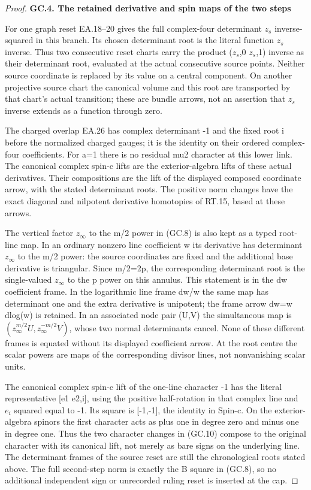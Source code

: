 \begin{proof}
\par

\medskip\noindent\textbf{GC.4. The retained derivative and spin maps of the two steps}

\par\nobreak

For one graph reset EA.18--20 gives the full complex-four
determinant \(z_{s}\) inverse-squared in this branch. Its chosen
determinant root is the literal function \(z_{s}\) inverse. Thus two
consecutive reset charts carry the product
(\(z_{s}\),0 \(z_{s}\),1) inverse as their determinant root, evaluated at
the actual consecutive source points. Neither source coordinate
is replaced by its value on a central component. On another
projective source chart the canonical volume and this root are
transported by that chart's actual transition; these are bundle
arrows, not an assertion that \(z_{s}\) inverse extends as a function
through zero.

The charged overlap EA.26 has complex determinant -1 and the
fixed root i before the normalized charged gauges; it is the
identity on their ordered complex-four coefficients. For a=1
there is no residual mu2 character at this lower link. The
canonical complex spin-c lifts are the exterior-algebra lifts
of these actual derivatives. Their compositions are the lift
of the displayed composed coordinate arrow, with the stated
determinant roots. The positive norm changes have the exact
diagonal and nilpotent derivative homotopies of RT.15, based
at these arrows.

The vertical factor \(z_{\infty}\) to the m/2 power in (GC.8) is also
kept as a typed root-line map. In an ordinary nonzero line
coefficient w its derivative has determinant \(z_{\infty}\) to the
m/2 power: the source coordinates are fixed and the additional
base derivative is triangular. Since m/2=2p, the corresponding
determinant root is the single-valued \(z_{\infty}\) to the p power
on this annulus. This statement is in the dw coefficient frame.
In the logarithmic line frame dw/w the same map has determinant
one and the extra derivative is unipotent; the frame arrow
dw=w dlog(w) is retained. In an associated node pair (U,V)
the simultaneous map is \((z_\infty^{m/2}U,z_\infty^{-m/2}V)\),
whose two normal determinants cancel. None of these different
frames is equated without its displayed coefficient arrow.
At the root centre the scalar powers are maps of the
corresponding divisor lines, not nonvanishing scalar units.

The canonical complex spin-c lift of the one-line character
-1 has the literal representative {[}e1 e2,i{]}, using the
positive half-rotation in that complex line and \(e_{i}\) squared
equal to -1. Its square is {[}-1,-1{]}, the identity in Spin-c.
On the exterior-algebra spinors the first character acts as
plus one in degree zero and minus one in degree one. Thus the
two character changes in (GC.10) compose to the original
character with its canonical lift, not merely as bare signs
on the underlying line. The determinant frames of the source
reset are still the chronological roots stated above. The full
second-step norm is exactly the B square in (GC.8), so no
additional independent sign or unrecorded ruling reset is
inserted at the cap.


\end{proof}
